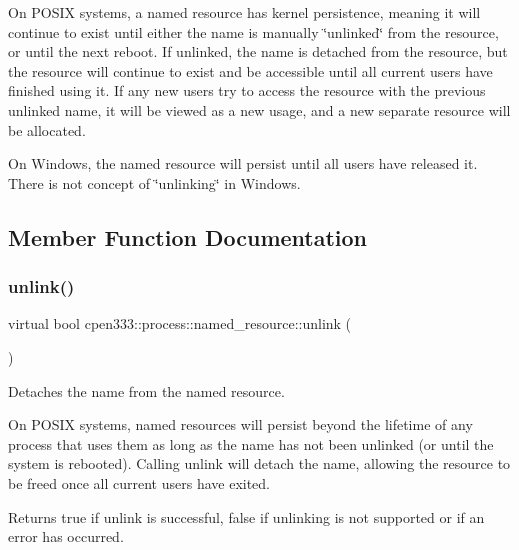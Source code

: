On P\+O\+S\+IX systems, a named resource has kernel persistence, meaning it will continue to exist until either the name is manually \char`\"{}unlinked\char`\"{} from the resource, or until the next reboot. If unlinked, the name is detached from the resource, but the resource will continue to exist and be accessible until all current users have finished using it. If any new users try to access the resource with the previous unlinked name, it will be viewed as a new usage, and a new separate resource will be allocated.

On Windows, the named resource will persist until all users have released it. There is not concept of \char`\"{}unlinking\char`\"{} in Windows. 

\subsection{Member Function Documentation}
\mbox{\label{classcpen333_1_1process_1_1named__resource_a5d33168fee48c9b0c58ab8fd96e230ce}} 
\subsubsection{\texorpdfstring{unlink()}{unlink()}\hspace{0.1cm}{\footnotesize\ttfamily [1/2]}}
{\footnotesize\ttfamily virtual bool cpen333\+::process\+::named\+\_\+resource\+::unlink (\begin{DoxyParamCaption}{ }\end{DoxyParamCaption})\hspace{0.3cm}{\ttfamily [pure virtual]}}



Detaches the name from the named resource. 

On P\+O\+S\+IX systems, named resources will persist beyond the lifetime of any process that uses them as long as the name has not been unlinked (or until the system is rebooted). Calling {\ttfamily unlink} will detach the name, allowing the resource to be freed once all current users have exited.

\begin{DoxyReturn}{Returns}
{\ttfamily true} if unlink is successful, {\ttfamily false} if unlinking is not supported or if an error has occurred. 
\end{DoxyReturn}


